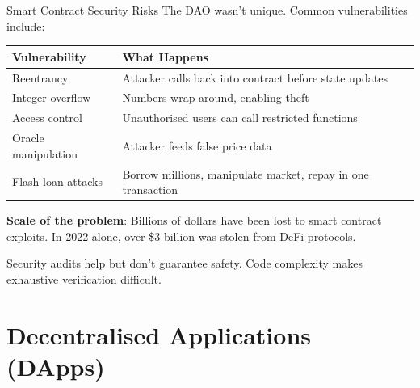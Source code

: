 \documentclass[10pt]{beamer}
\begin{document}
\begin{frame}{Smart Contract Security Risks}
  The DAO wasn't unique. Common vulnerabilities include:
  
  \vspace{.5em}
  \begin{center}
  \begin{tabular}{lp{6.5cm}}
    \toprule
    \textbf{Vulnerability} & \textbf{What Happens} \\
    \midrule
    Reentrancy & Attacker calls back into contract before state updates \\
    Integer overflow & Numbers wrap around, enabling theft \\
    Access control & Unauthorised users can call restricted functions \\
    Oracle manipulation & Attacker feeds false price data \\
    Flash loan attacks & Borrow millions, manipulate market, repay in one transaction \\
    \bottomrule
  \end{tabular}
  \end{center}
  
  \vspace{1em}
  \textbf{Scale of the problem}: Billions of dollars have been lost to smart contract exploits. In 2022 alone, over \$3 billion was stolen from DeFi protocols.
  
  \vspace{0.5em}
  Security audits help but don't guarantee safety. Code complexity makes exhaustive verification difficult.
\end{frame}

\section{Decentralised Applications (DApps)}
\end{document}
